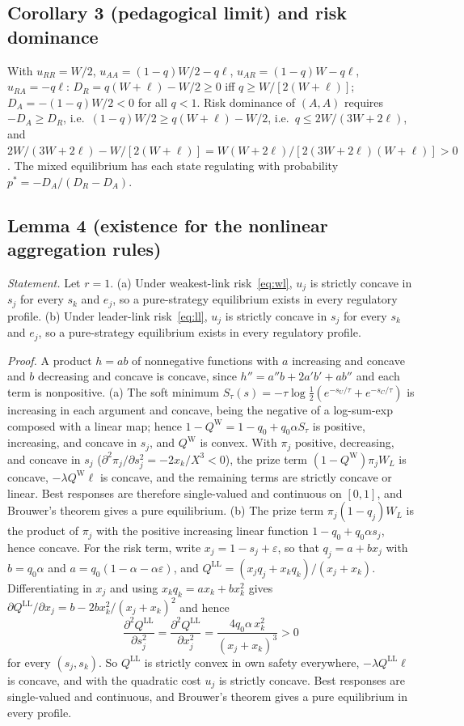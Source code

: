 \documentclass[11pt]{article}
\theoremstyle{plain}
\theoremstyle{definition}
\theoremstyle{remark}
\newcommand{\WL}{W_{\!L}}
\begin{document}
\subsection{Corollary 3 (pedagogical limit) and risk dominance}
With $u_{RR}=W/2$, $u_{AA}=(1-q)W/2-q\ell$, $u_{AR}=(1-q)W-q\ell$, $u_{RA}=-q\ell$: $D_R=q(W+\ell)-W/2\ge0$ iff $q\ge W/[2(W+\ell)]$; $D_A=-(1-q)W/2<0$ for all $q<1$. Risk dominance of $(A,A)$ requires $-D_A\ge D_R$, i.e.\ $(1-q)W/2\ge q(W+\ell)-W/2$, i.e.\ $q\le 2W/(3W+2\ell)$, and $2W/(3W+2\ell)-W/[2(W+\ell)]=W(W+2\ell)/[2(3W+2\ell)(W+\ell)]>0$. The mixed equilibrium has each state regulating with probability $p^*=-D_A/(D_R-D_A)$.

\subsection{Lemma 4 (existence for the nonlinear aggregation rules)}
\emph{Statement.} Let $r=1$. (a) Under weakest-link risk~\eqref{eq:wl}, $u_j$ is strictly concave in $s_j$ for every $s_k$ and $e_j$, so a pure-strategy equilibrium exists in every regulatory profile. (b) Under leader-link risk~\eqref{eq:ll}, $u_j$ is strictly concave in $s_j$ for every $s_k$ and $e_j$, so a pure-strategy equilibrium exists in every regulatory profile.

\emph{Proof.} A product $h=ab$ of nonnegative functions with $a$ increasing and concave and $b$ decreasing and concave is concave, since $h''=a''b+2a'b'+ab''$ and each term is nonpositive. (a) The soft minimum $S_\tau(s)=-\tau\log\tfrac12(e^{-s_U/\tau}+e^{-s_C/\tau})$ is increasing in each argument and concave, being the negative of a log-sum-exp composed with a linear map; hence $1-Q^{\mathrm W}=1-q_0+q_0\alpha S_\tau$ is positive, increasing, and concave in $s_j$, and $Q^{\mathrm W}$ is convex. With $\pi_j$ positive, decreasing, and concave in $s_j$ ($\partial^2\pi_j/\partial s_j^2=-2x_k/X^3<0$), the prize term $(1-Q^{\mathrm W})\pi_j\WL$ is concave, $-\lambda Q^{\mathrm W}\ell$ is concave, and the remaining terms are strictly concave or linear. Best responses are therefore single-valued and continuous on $[0,1]$, and Brouwer's theorem gives a pure equilibrium. (b) The prize term $\pi_j(1-q_j)\WL$ is the product of $\pi_j$ with the positive increasing linear function $1-q_0+q_0\alpha s_j$, hence concave. For the risk term, write $x_j=1-s_j+\varepsilon$, so that $q_j=a+bx_j$ with $b=q_0\alpha$ and $a=q_0(1-\alpha-\alpha\varepsilon)$, and $Q^{\mathrm{LL}}=(x_jq_j+x_kq_k)/(x_j+x_k)$. Differentiating in $x_j$ and using $x_kq_k=ax_k+bx_k^2$ gives $\partial Q^{\mathrm{LL}}/\partial x_j=b-2bx_k^2/(x_j+x_k)^2$ and hence
\[
\frac{\partial^2Q^{\mathrm{LL}}}{\partial s_j^2}=\frac{\partial^2Q^{\mathrm{LL}}}{\partial x_j^2}=\frac{4q_0\alpha\,x_k^2}{(x_j+x_k)^3}>0
\]
for every $(s_j,s_k)$. So $Q^{\mathrm{LL}}$ is strictly convex in own safety everywhere, $-\lambda Q^{\mathrm{LL}}\ell$ is concave, and with the quadratic cost $u_j$ is strictly concave. Best responses are single-valued and continuous, and Brouwer's theorem gives a pure equilibrium in every profile.
\end{document}
